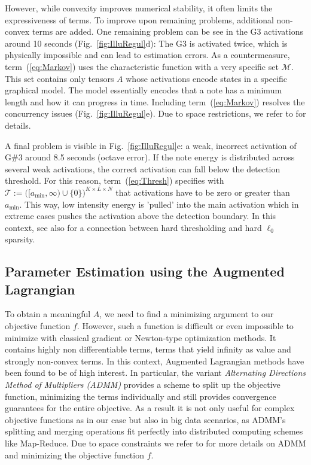\documentclass{article}
\def\act{{A}}
\def\objf{{f}}
\def\markov{{\mathcal M}}
\def\threshset{{\mathcal T}}
\def\markov{{\mathcal M}}
\def\minact{{a_\text{min}}}
\begin{document}
However, while convexity improves numerical stability, it often limits the expressiveness of terms. To improve upon remaining problems, additional non-convex terms are added. One remaining problem can be see in the G3 activations around 10 seconds (Fig.~\ref{fig:IlluRegul}d): The G3 is activated twice, which is physically impossible and can lead to estimation errors. As a countermeasure, term~(\ref{eq:Markov}) uses the characteristic function with a very specific set $\markov$. This set contains only tensors $\act$ whose activations encode states in a specific graphical model. The model essentially encodes that a note has a minimum length and how it can progress in time. Including term~(\ref{eq:Markov}) resolves the concurrency issues (Fig.~\ref{fig:IlluRegul}e). Due to space restrictions, we refer to \cite{EwertS16_PianoTranscriptionADMM_TASLP} for details.

A final problem is visible in Fig.~\ref{fig:IlluRegul}e: a weak, incorrect activation of G\#3 around 8.5 seconds (octave error). If the note energy is distributed across several weak activations, the correct activation can fall below the detection threshold. For this reason, term~(\ref{eq:Thresh}) specifies with $\threshset := \big( [\minact,\infty) \cup \{0\} \big)^{K \times L \times N}$ that activations have to be zero or greater than $\minact$. This way, low intensity energy is 'pulled' into the main activation which in extreme cases pushes the activation above the detection boundary. In this context, see also \cite{BlumensathD2010_IterativeHardThreshL0_JSTSP} for a connection between hard thresholding and hard $\ell_0$ sparsity.

\subsection{Parameter Estimation using the Augmented Lagrangian}

To obtain a meaningful $\act$, we need to find a minimizing argument to our objective function $\objf$.
However, such a function is difficult or even impossible to minimize with classical gradient or Newton-type optimization methods.
It contains highly non differentiable terms, terms that yield infinity as value and strongly non-convex terms. 
In this context, Augmented Lagrangian methods have been found to be of high interest. 
In particular, the variant \emph{Alternating Directions Method of Multipliers (ADMM)} \cite{BoydPCPE11_ADMM_Book} 
provides a scheme to split up the
objective function, minimizing the terms individually and still
provides convergence guarantees for the entire objective. As a
result it is not only useful for complex objective functions as
in our case but also in big data scenarios, as ADMM's splitting
and merging operations fit perfectly into distributed computing
schemes like Map-Reduce. Due to space constraints we refer to \cite{EwertS16_PianoTranscriptionADMM_TASLP} for more details on ADMM and minimizing the objective function $\objf$. 
\end{document}
